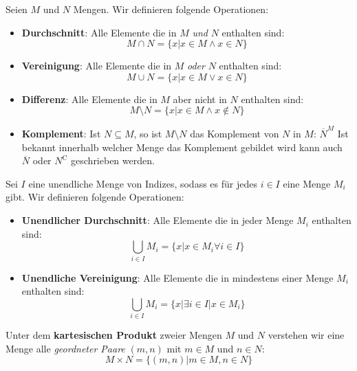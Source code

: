 \documentclass[../../main.tex]{subfiles}
\begin{document}
	\begin{definition}
		Seien $M$ und $N$ Mengen. Wir definieren folgende Operationen: 
		\begin{itemize}
			\item \textbf{Durchschnitt}: Alle Elemente die in $M$ \textit{und} $N$ enthalten sind: $$M \cap N = \{x | x \in M \land x \in N\}$$
			\item \textbf{Vereinigung}: Alle Elemente die in $M$ \textit{oder} $N$ enthalten sind: $$M \cup N = \{x | x \in M \lor x \in N\}$$
			\item \textbf{Differenz}: Alle Elemente die in $M$ aber nicht in $N$ enthalten sind: $$M \setminus N = \{x | x \in M \land x \not \in N\}$$
			\item \textbf{Komplement}: Ist $N \subseteq M$, so ist $M \setminus N$ das Komplement von $N$ in $M$: $\overline{N}^M$ Ist bekannt innerhalb welcher Menge das Komplement gebildet wird kann auch $\overline{N}$ oder $N^\mathrm{C}$ geschrieben werden.
		\end{itemize}
	\end{definition}

	\begin{definition}
		Sei $I$ eine unendliche Menge von Indizes, sodass es für jedes $i \in I$ eine Menge $M_i$ gibt. Wir definieren folgende Operationen:
		\begin{itemize}
			\item \textbf{Unendlicher Durchschnitt}: Alle Elemente die in jeder Menge $M_i$ enthalten sind: $$\bigcup_{i \in I}M_i = \{x | x \in M_i \forall i \in I\}$$
			\item \textbf{Unendliche Vereinigung}: Alle Elemente die in mindestens einer Menge $M_i$ enthalten sind: $$\bigcup_{i \in I}M_i = \{x | \exists i \in I | x \in M_i\}$$
		\end{itemize}
	\end{definition}

	\begin{definition}
		Unter dem \textbf{kartesischen Produkt} zweier Mengen $M$ und $N$ verstehen wir eine Menge alle \textit{geordneter Paare}  $(m, n)$ mit $m \in M$ und $n \in N$: $$M \times N = \{(m,n) | m \in M, n \in N \}$$
	\end{definition}
\end{document}
